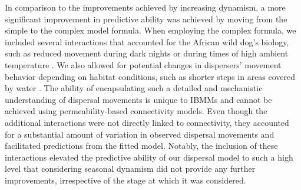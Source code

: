 \documentclass[../FinalThesis.tex]{subfiles}
\begin{document}
In comparison to the improvements achieved by increasing dynamism, a more
significant improvement in predictive ability was achieved by moving from the
simple to the complex model formula. When employing the complex formula, we
included several interactions that accounted for the African wild dog's biology,
such as reduced movement during dark nights \citep{Cozzi.2013} or during times
of high ambient temperature \citep{Rabaiotti.2021}. We also allowed for
potential changes in dispersers' movement behavior depending on habitat
conditions, such as shorter steps in areas covered by water
\citep{Hofmann.2023}. The ability of encapsulating such a detailed and
mechanistic understanding of dispersal movements is unique to IBMMs and cannot
be achieved using permeability-based connectivity models. Even though the
additional interactions were not directly linked to connectivity, they accounted
for a substantial amount of variation in observed dispersal movements and
facilitated predictions from the fitted model. Notably, the inclusion of these
interactions elevated the predictive ability of our dispersal model to such a
high level that considering seasonal dynamism did not provide any further
improvements, irrespective of the stage at which it was considered.


\end{document}
